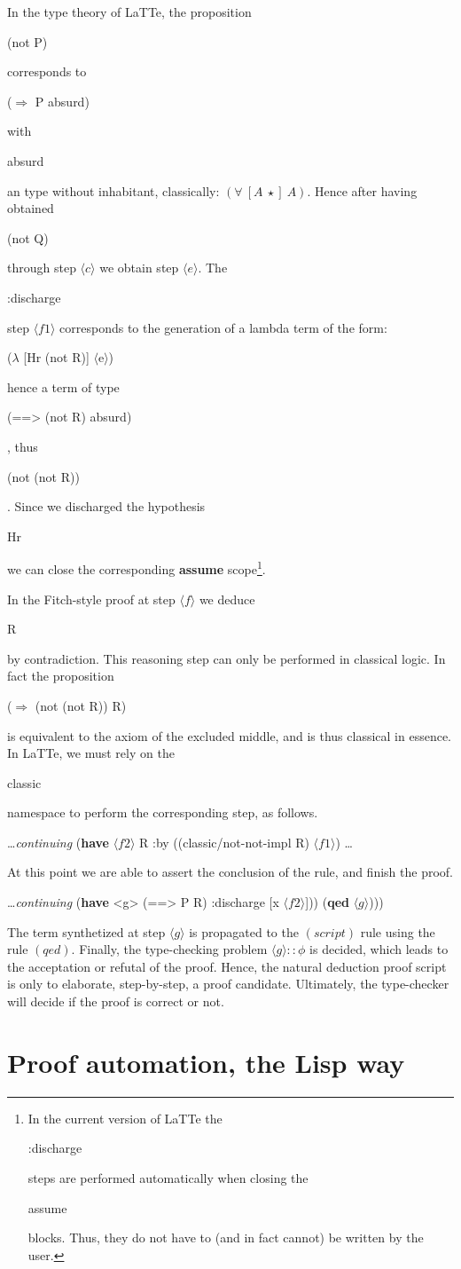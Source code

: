 \documentclass{styles/sig-alternate-05-2015}
\newcommand{\typeterm}{\star}
\newcommand{\kw}[1]{\textbf{#1}}
\newcommand{\cmt}[1]{\textit{#1}}
\newcommand{\code}[1]{\begin{sffamily}{\small #1}\end{sffamily}}
\begin{document}
In the type theory of LaTTe, the proposition \code{(not P)} corresponds to \code{($\Longrightarrow$ P absurd)}
with \code{absurd} an type without inhabitant, classically: $(\forall~[A~\typeterm]~A)$. Hence after having
obtained \code{(not Q)} through step $\langle{c}\rangle$ we obtain step $\langle{e}\rangle$. The \code{:discharge}
step $\langle{f1}\rangle$ corresponds to the generation of a lambda term of the form: \code{($\lambda$ [Hr (not R)] $\langle$e$\rangle$)}
   hence a term of type \code{(==> (not R) absurd)}, thus \code{(not (not R))}. Since we discharged the hypothesis \code{Hr} we can close the corresponding \kw{assume} scope\footnote{In the current version of LaTTe the \code{:discharge} steps are performed automatically when closing the \code{assume} blocks. Thus, they do not have to (and in fact cannot) be written by the user.}.

   In the Fitch-style proof at step $\langle{f}\rangle$ we deduce \code{R} by contradiction. This reasoning step can only be performed in classical logic. In fact the proposition \code{($\Longrightarrow$ (not (not R)) R)} is equivalent to the axiom of the excluded middle, and is thus classical in essence. In LaTTe, we must rely on the \code{classic} namespace to perform the corresponding step, as follows.

\begin{program}
        \ldots \cmt{continuing}
        (\kw{have} $\langle{f2}\rangle$ R
              :by ((classic/not-not-impl R) $\langle{f1}\rangle$)
        \ldots
 \end{program}

At this point we are able to assert the conclusion of the rule, and finish the proof.

\begin{program}
        \ldots \cmt{continuing}
        (\kw{have} <g> (==> P R) :discharge [x $\langle{f2}\rangle$]))
      (\kw{qed} $\langle{g}\rangle$)))
\end{program}

The term synthetized at step $\langle{g}\rangle$ is propagated to
the $(script)$ rule using the rule $(qed)$. Finally, the type-checking
problem $\langle{g}\rangle :: \phi$ is decided, which leads to the
acceptation or refutal of the proof. Hence, the natural deduction
proof script is only to elaborate, step-by-step, a proof candidate.
Ultimately, the type-checker will decide if the proof is correct
 or not.


\section{Proof automation, the Lisp way}
\label{sec:auto}
\end{document}
